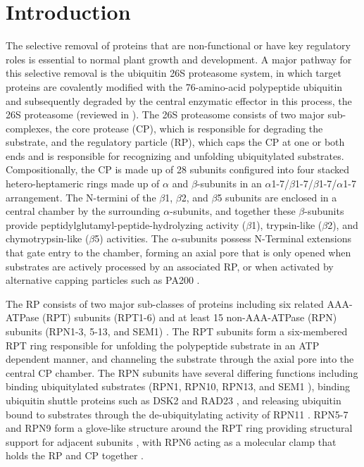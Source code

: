 \section{Introduction}
	The selective removal of proteins that are non-functional or have key regulatory roles is essential to normal plant growth and development. A major pathway for this selective removal is the ubiquitin 26S proteasome system, in which target proteins are covalently modified with the 76-amino-acid polypeptide ubiquitin and subsequently degraded by the central enzymatic effector in this process, the 26S proteasome (reviewed in \citep{finley09, livneh16, vierstra09}). The 26S proteasome consists of two major sub-complexes, the core protease (CP), which is responsible for degrading the substrate, and the regulatory particle (RP), which caps the CP at one or both ends and is responsible for recognizing and unfolding ubiquitylated substrates. Compositionally, the CP is made up of 28 subunits configured into four stacked hetero-heptameric rings made up of $\alpha$ and $\beta$-subunits in an $\alpha$1-7/$\beta$1-7/$\beta$1-7/$\alpha$1-7 arrangement. The N-termini of the $\beta$1, $\beta$2, and $\beta$5 subunits are enclosed in a central chamber by the surrounding $\alpha$-subunits, and together these $\beta$-subunits provide peptidylglutamyl-peptide-hydrolyzing activity ($\beta$1), trypsin-like ($\beta$2), and chymotrypsin-like ($\beta$5) activities. The $\alpha$-subunits possess N-Terminal extensions that gate entry to the chamber, forming an axial pore that is only opened when substrates are actively processed by an associated RP, or when activated by alternative capping particles such as PA200 \citep{dange11, sadre-bazzaz10}.
	
The RP consists of two major sub-classes of proteins including six related AAA-ATPase (RPT) subunits (RPT1-6) and at least 15 non-AAA-ATPase (RPN) subunits (RPN1-3, 5-13, and SEM1) \citep{finley09, paraskevopoulos14, russell13}. The RPT subunits form a six-membered RPT ring responsible for unfolding the polypeptide substrate in an ATP dependent manner, and channeling the substrate through the axial pore into the central CP chamber. The RPN subunits have several differing functions including binding ubiquitylated substrates (RPN1, RPN10, RPN13, and SEM1 \citep{elsasser04, paraskevopoulos14, schreiner08, shi16}), binding ubiquitin shuttle proteins such as DSK2 and RAD23 \citep{elsasser02, farmer10, fatimababy10, lin11}, and releasing ubiquitin bound to substrates through the de-ubiquitylating activity of RPN11 \citep{verma02, yao02}.  RPN5-7 and RPN9 form a glove-like structure around the RPT ring providing structural support for adjacent subunits \citep{lander12, lasker12, unverdorben14}, with RPN6 acting as a molecular clamp that holds the RP and CP together \citep{pathare12}.

